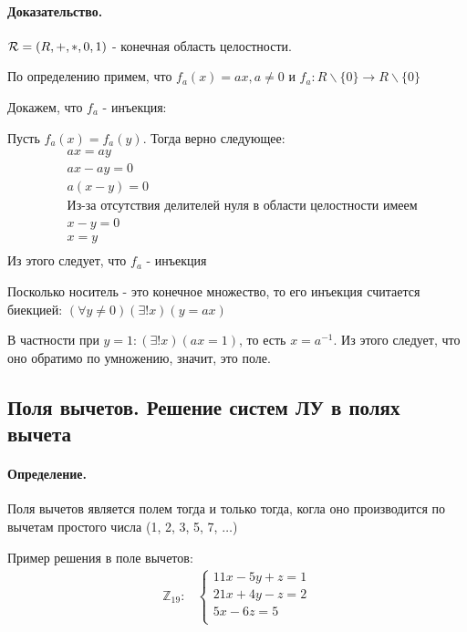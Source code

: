 \documentclass{report}
\begin{document}
\paragraph*{Доказательство.}
${\cal R} = (R, +, *, 0, 1)$ - конечная область целостности.

По определению примем, что $f_a(x) = ax, a\neq 0 $ и $f_a: R\backslash\{0\} \to R\backslash\{0\}$

\medskip

Докажем, что $f_a$ - инъекция:

Пусть $f_{a}(x) = f_{a}(y)$. Тогда верно следующее:
\[
\begin{align*}
	&ax = ay \\
	&ax - ay = 0 \\
	&a(x - y) = 0 \\
	&\mbox{Из-за отсутствия делителей нуля в области целостности имеем} \\
	&x - y = 0 \\
	&x = y \\
\end{align*}
\] 
Из этого следует, что $f_{a}$ - инъекция

\medskip

Посколько носитель - это конечное множество, то его инъекция считается биекцией:
$(\forall y \neq 0)(\exists! x)(y = ax)$

В частности при $y = 1: (\exists! x)(ax = 1)$, то есть $x = a^{-1}$. Из этого
следует, что оно обратимо по умножению, значит, это поле.

\subsection{Поля вычетов. Решение систем ЛУ в полях вычета}
\paragraph*{Определение.}
Поля вычетов является полем тогда и только тогда, когла оно 
производится по вычетам простого числа (1, 2, 3, 5, 7, $\ldots$)

\medskip

Пример решения в поле вычетов:
\begin{align*}
	\mathbb{Z}_{19}: & \begin{cases}
		                   11x - 5y +z = 1  \\
		                   21x + 4y - z = 2 \\
		                   5x - 6z = 5      \\
	                   \end{cases} \\
\end{align*}
\end{document}
